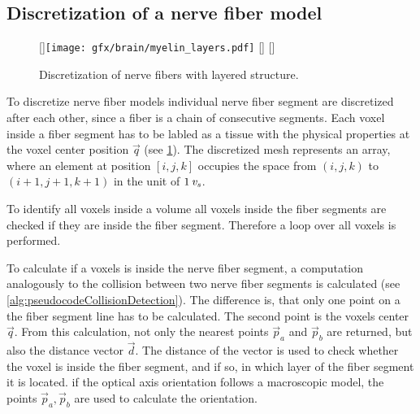 \subsection{Discretization of a nerve fiber model}
%
\begin{figure}[!t]
\centering
\setlength{\tikzwidth}{0.3\textwidth}
[\tikzwidth]{\texttt{[image: gfx/brain/myelin\_layers.pdf]}\vspace{0mm}}\hfill
{}
[\tikzwidth]{\vspace{-5mm}}\hfill
{}
[\tikzwidth]{\vspace{-5mm}}
\caption{Discretization of nerve fibers with layered structure.}
\label{fig:fiber_discretization}
\end{figure}
%
To discretize nerve fiber models individual nerve fiber segment are discretized after each other, since a fiber is a chain of consecutive segments.
Each voxel inside a fiber segment has to be labled as a tissue with the physical properties at the voxel center position $\vec{q}$ (see \cref{fig:fiber_discretization}).
The discretized mesh represents an array, where an element at position $[i,j,k]$ occupies the space from $(i,j,k)$ to $(i+1,j+1,k+1)$ in the unit of $\SI{1}{\textnormal{$\mathit{v_{s}}$}}$.
\par
%
To identify all voxels inside a volume all voxels inside the fiber segments are checked if they are inside the fiber segment.
Therefore a loop over all voxels is performed.
\par
%
To calculate if a voxels is inside the nerve fiber segment,
a computation analogously to the collision between two nerve fiber segments is calculated (see \cref{alg:pseudocodeCollisionDetection}).
The difference is, that only one point on a the fiber segment line has to be calculated.
The second point is the voxels center $\vec{q}$.
From this calculation, not only the nearest points $\vec{p}_a$ and $\vec{p}_b$ are returned, but also the distance vector $\vec{d}$.
The distance of the vector is used to check whether the voxel is inside the fiber segment, and if so, in which layer of the fiber segment it is located.
if the optical axis orientation follows a macroscopic model, the points $\vec{p}_a, \vec{p}_b$ are used to calculate the orientation.
